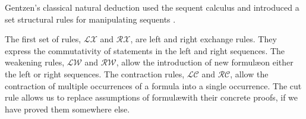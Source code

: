   Gentzen's classical natural deduction used the sequent calculus and introduced a set structural rules for manipulating sequents \cite{Groote94}.
  
  
  The first set of rules, $\mathcal{LX}$ and $\mathcal{RX}$, are left and right exchange rules. 
  They express the commutativity of statements in the left and right sequences.
  The weakening rules, $\mathcal{LW}$ and $\mathcal{RW}$, allow the introduction of new formul\ae on either the left or right sequences.
  The contraction rules, $\mathcal{LC}$ and $\mathcal{RC}$, allow the contraction of multiple occurrences of a formula into a single occurrence. 
  The cut rule allows us to replace assumptions of formul\ae with their concrete proofs, if we have proved them somewhere else.
  
